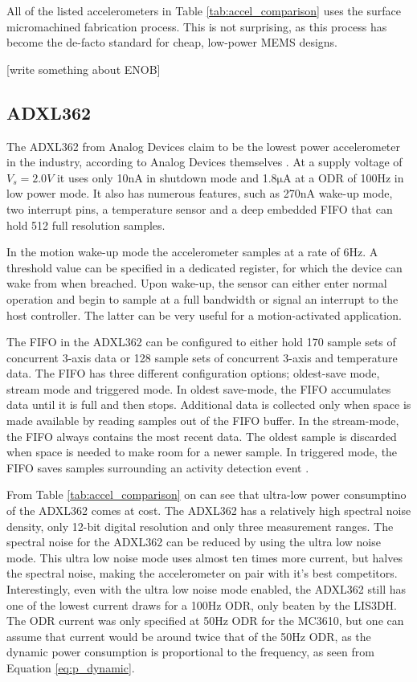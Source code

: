 All of the listed accelerometers in Table \ref{tab:accel_comparison} uses the surface micromachined fabrication process. This is not surprising, as this process has become the de-facto standard for cheap, low-power MEMS designs.

[write something about ENOB]

\subsection{ADXL362}

The ADXL362 from Analog Devices claim to be the lowest power accelerometer in the industry, according to Analog Devices themselves \cite{analog12}. At a supply voltage of $V_s = 2.0 V$ it uses only 10nA in shutdown mode and 1.8$\si{\micro\ampere}$ at a ODR of 100Hz in low power mode. It also has numerous features, such as 270nA wake-up mode, two interrupt pins, a temperature sensor and a deep embedded FIFO that can hold 512 full resolution samples. 

In the motion wake-up mode the accelerometer samples at a rate of 6Hz. A threshold value can be specified in a dedicated register, for which the device can wake from when breached. Upon wake-up, the sensor can either enter normal operation and begin to sample at a full bandwidth or signal an interrupt to the host controller. The latter can be very useful for a motion-activated application. 

The FIFO in the ADXL362 can be configured to either hold 170 sample sets of concurrent 3-axis data or 128 sample sets of concurrent 3-axis and temperature data. The FIFO has three different configuration options; oldest-save mode, stream mode and triggered mode. In oldest save-mode, the  FIFO accumulates data until it is full and then stops. Additional data is collected only when space is made available by reading samples out of the FIFO buffer. In the stream-mode, the FIFO always contains the most recent data. The oldest sample is discarded when space is needed to make room for a newer sample. In triggered mode, the FIFO saves samples surrounding an activity detection event \cite[p~38]{ADXL362}.

From Table \ref{tab:accel_comparison} on can see that ultra-low power consumptino of the ADXL362 comes at cost. The ADXL362 has a relatively high spectral noise density, only 12-bit digital resolution and only three measurement ranges. The spectral noise for the ADXL362 can be reduced by using the ultra low noise mode. This ultra low noise mode uses almost ten times more current, but halves the spectral noise, making the accelerometer on pair with it's best competitors. Interestingly, even with the ultra low noise mode enabled, the ADXL362 still has one of the lowest current draws for a 100Hz ODR, only beaten by the LIS3DH. The ODR current was only specified at 50Hz ODR for the MC3610, but one can assume that current would be around twice that of the 50Hz ODR, as the dynamic power consumption is proportional to the frequency, as seen from Equation \ref{eq:p_dynamic}.


